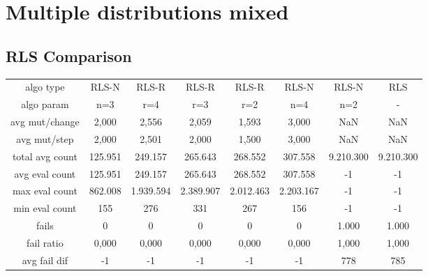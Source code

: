 \section{Multiple distributions mixed}
\subsection{RLS Comparison}
\begin{tabular}[h]{cccccccc}
algo type&               RLS-N&        RLS-R&        RLS-R&        RLS-R&        RLS-N&        RLS-N&          RLS\\
algo param&                n=3&          r=4&          r=3&          r=2&          n=4&          n=2&            -\\
avg mut/change&          2,000&        2,556&        2,059&        1,593&        3,000&          NaN&          NaN\\
avg mut/step&            2,000&        2,501&        2,000&        1,500&        3,000&          NaN&          NaN\\
\hline
total avg count&       125.951&      249.157&      265.643&      268.552&      307.558&    9.210.300&    9.210.300\\
avg eval count&        125.951&      249.157&      265.643&      268.552&      307.558&           -1&           -1\\
max eval count&        862.008&    1.939.594&    2.389.907&    2.012.463&    2.203.167&           -1&           -1\\
min eval count&            155&          276&          331&          267&          156&           -1&           -1\\
\hline
fails&                       0&            0&            0&            0&            0&        1.000&        1.000\\
fail ratio&              0,000&        0,000&        0,000&        0,000&        0,000&        1,000&        1,000\\
avg fail dif&               -1&           -1&           -1&           -1&           -1&          778&          785\\
\end{tabular}
